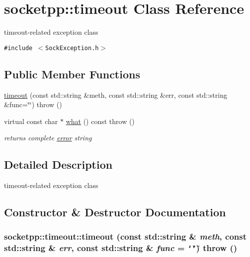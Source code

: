\hypertarget{classsocketpp_1_1timeout}{
\section{socketpp::timeout Class Reference}
\label{classsocketpp_1_1timeout}
}
timeout-related exception class  


{\tt \#include $<$SockException.h$>$}

\subsection*{Public Member Functions}
\begin{CompactItemize}
\item 
\hyperlink{classsocketpp_1_1timeout_e93bd15dc9a3209c582782770b909049}{timeout} (const std::string \&meth, const std::string \&err, const std::string \&func=\char`\"{}\char`\"{})  throw ()
\item 
\hypertarget{classsocketpp_1_1timeout_4ec44590b052339b206a94afbcba6ffb}{
virtual const char $\ast$ \hyperlink{classsocketpp_1_1timeout_4ec44590b052339b206a94afbcba6ffb}{what} () const   throw ()}
\label{classsocketpp_1_1timeout_4ec44590b052339b206a94afbcba6ffb}

\begin{CompactList}\small\item\em returns complete \hyperlink{classsocketpp_1_1error}{error} string \item\end{CompactList}\end{CompactItemize}


\subsection{Detailed Description}
timeout-related exception class 

\subsection{Constructor \& Destructor Documentation}
\hypertarget{classsocketpp_1_1timeout_e93bd15dc9a3209c582782770b909049}{
\subsubsection{\setlength{\rightskip}{0pt plus 5cm}socketpp::timeout::timeout (const std::string \& {\em meth}, \/  const std::string \& {\em err}, \/  const std::string \& {\em func} = {\tt \char`\"{}\char`\"{}})  throw ()}}
\label{classsocketpp_1_1timeout_e93bd15dc9a3209c582782770b909049}


